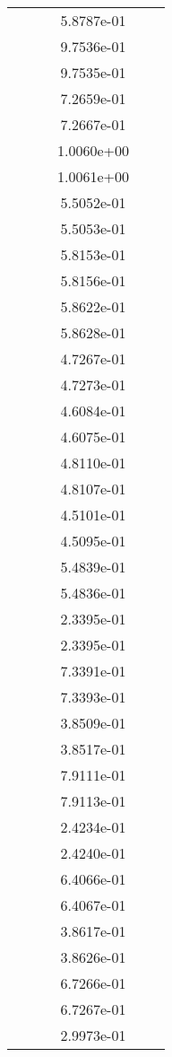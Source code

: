 \begin{xltabular}{\textwidth}{r|rS[table-format=1.3e+2]S[table-format=1.4e+2]S[table-format=1.4e+2]S[table-format=-1.5]}
&  &  & 5.8787e-01 & & \\
&  &  & 9.7536e-01 & & \\
&  &  & 9.7535e-01 & & \\
&  &  & 7.2659e-01 & & \\
&  &  & 7.2667e-01 & & \\
&  &  & 1.0060e+00 & & \\
&  &  & 1.0061e+00 & & \\
&  &  & 5.5052e-01 & & \\
&  &  & 5.5053e-01 & & \\
&  &  & 5.8153e-01 & & \\
&  &  & 5.8156e-01 & & \\
&  &  & 5.8622e-01 & & \\
&  &  & 5.8628e-01 & & \\
&  &  & 4.7267e-01 & & \\
&  &  & 4.7273e-01 & & \\
&  &  & 4.6084e-01 & & \\
&  &  & 4.6075e-01 & & \\
&  &  & 4.8110e-01 & & \\
&  &  & 4.8107e-01 & & \\
&  &  & 4.5101e-01 & & \\
&  &  & 4.5095e-01 & & \\
&  &  & 5.4839e-01 & & \\
&  &  & 5.4836e-01 & & \\
&  &  & 2.3395e-01 & & \\
&  &  & 2.3395e-01 & & \\
&  &  & 7.3391e-01 & & \\
&  &  & 7.3393e-01 & & \\
&  &  & 3.8509e-01 & & \\
&  &  & 3.8517e-01 & & \\
&  &  & 7.9111e-01 & & \\
&  &  & 7.9113e-01 & & \\
&  &  & 2.4234e-01 & & \\
&  &  & 2.4240e-01 & & \\
&  &  & 6.4066e-01 & & \\
&  &  & 6.4067e-01 & & \\
&  &  & 3.8617e-01 & & \\
&  &  & 3.8626e-01 & & \\
&  &  & 6.7266e-01 & & \\
&  &  & 6.7267e-01 & & \\
&  &  & 2.9973e-01 & & \\

\end{xltabular}
